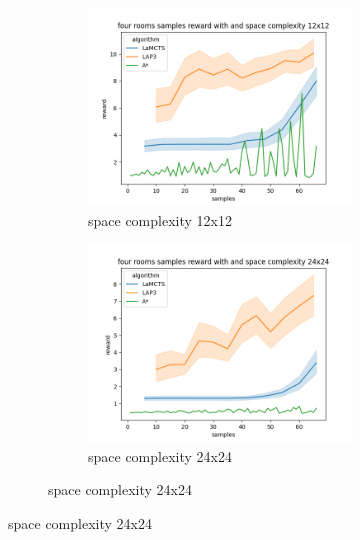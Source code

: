 \documentclass[bibliography=totoc]{scrartcl}
\begin{document}
\begin{figure}[H]
\begin{figure}[H]
	\centering
	\begin{subfigure}[b]{0.3\linewidth}
		\includegraphics[width=\linewidth]{img/four_rooms_samples__reward_b_8_LAP3_MCTS_AStar_interrupted_12.png}
        \caption{space complexity 12x12}	
    \end{subfigure}
	\hspace{0.02\textwidth}
	\begin{subfigure}[b]{0.3\linewidth}
		\includegraphics[width=\linewidth]{img/four_rooms_samples__reward_b_8_LAP3_MCTS_AStar_interrupted_24.png}
		\caption{space complexity 24x24}
	\end{subfigure}
	\hspace{0.02\textwidth}

\end{figure}
\end{figure}
\end{document}
